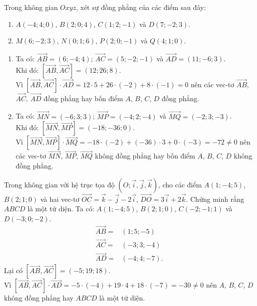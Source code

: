 \begin{vd}%
	Trong không gian $Oxyz$, xét sự đồng phẳng của các điểm sau đây:
	\begin{enumerate}
		\item $A(-4;4;0)$, $B(2;0;4)$, $C(1;2;-1)$ và $D(7;-2;3)$.
		\item $M(6;-2;3)$, $N(0;1;6)$, $P(2;0;-1)$ và $Q(4;1;0)$.
	\end{enumerate}
	\loigiai
	{
		\begin{enumerate}
			\item Ta có: $\overrightarrow{AB} = (6;-4;4)$; $\overrightarrow{AC} = (5;-2;-1)$ và $\overrightarrow{AD} = (11;-6;3)$.\\
			Khi đó: $\left[ \overrightarrow{AB},\overrightarrow{AC} \right] = (12;26;8)$.\\
			Vì $\left[ \overrightarrow{AB},\overrightarrow{AC} \right] \cdot \overrightarrow{AD} = 12 \cdot 5 + 26 \cdot (-2) + 8 \cdot (-1) = 0$ nên các vec-tơ $\overrightarrow{AB}$, $\overrightarrow{AC}$, $\overrightarrow{AD}$ đồng phẳng hay bốn điểm $A$, $B$, $C$, $D$ đồng phẳng.
			
			\item Ta có: $\overrightarrow{MN} = (-6;3;3)$; $\overrightarrow{MP} = (-4;2;-4)$ và $\overrightarrow{MQ} = (-2;3;-3)$.\\
			Khi đó: $\left[ \overrightarrow{MN},\overrightarrow{MP} \right] = (-18;-36;0)$.\\
			Vì $\left[ \overrightarrow{MN},\overrightarrow{MP} \right] \cdot \overrightarrow{MQ} = -18 \cdot (-2) + (-36) \cdot 3 + 0 \cdot (-3) = -72 \neq 0$ nên các vec-tơ $\overrightarrow{MN}$, $\overrightarrow{MP}$, $\overrightarrow{MQ}$ không đồng phẳng hay bốn điểm $A$, $B$, $C$, $D$ không đồng phẳng.
		\end{enumerate}
	}
\end{vd}


\begin{vd}%
	Trong không gian với hệ trục tọa độ $\left(O;\vec{i}, \vec{j}, \vec{k} \right)$, cho các điểm $A(1;-4;5)$, $B(2;1;0)$ và hai vec-tơ $\overrightarrow{OC} = \vec{k} - \vec{j} - 2\vec{i}$, $\overrightarrow{DO} = 3\vec{i} + 2\vec{k}$. Chứng minh rằng $ABCD$ là một tứ diện.
	\loigiai
	{
		Ta có: $A(1;-4;5)$, $B(2;1;0)$, $C(-2;-1;1)$ và $D(-3;0;-2)$.
		\begin{align*}
		\overrightarrow{AB} = &(1;5;-5)\\
		\overrightarrow{AC} = &(-3;3;-4)\\
		\overrightarrow{AD} = &(-4;4;-7).
		\end{align*}
		Lại có $\left[ \overrightarrow{AB}, \overrightarrow{AC} \right] = (-5;19;18)$.\\
		Vì $\left[ \overrightarrow{AB}, \overrightarrow{AC} \right] \cdot \overrightarrow{AD} = -5 \cdot (-4) + 19 \cdot 4 + 18 \cdot (-7) = -30 \neq 0$ nên $A$, $B$, $C$, $D$ không đồng phẳng hay $ABCD$ là một tứ diện.
	}
\end{vd}




